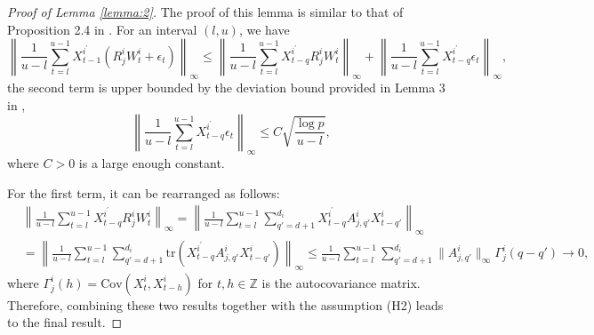 \documentclass[11pt]{article}
\begin{document}
\begin{proof}[Proof of Lemma \ref{lemma:2}]
    The proof of this lemma is similar to that of Proposition 2.4 in \cite{basu2015regularized}. For an interval $(l,u)$, we have
    \begin{equation*}
        \left\| \frac{1}{u-l}\sum_{t=l}^{u-1}X_{t-1}^{i^\prime}\left(R_j^iW_t^i + \epsilon_t\right) \right\|_\infty \leq \left\| \frac{1}{u-l}\sum_{t=l}^{u-1}X_{t-q}^{i^\prime}R_j^iW_t^i \right\|_\infty + \left\| \frac{1}{u-l}\sum_{t=l}^{u-1}X_{t-q}^{i^\prime}\epsilon_t \right\|_\infty,
    \end{equation*}
    the second term is upper bounded by the deviation bound provided in Lemma 3 in \cite{safikhani2020joint}, 
    \begin{equation*}
        \left\| \frac{1}{u-l}\sum_{t=l}^{u-1}X_{t-q}^{i^\prime}\epsilon_t \right\|_\infty \leq C\sqrt{\frac{\log p}{u-l}},
    \end{equation*}
    where $C>0$ is a large enough constant.
    
    For the first term, it can be rearranged as follows:
    \begin{equation*}
        \begin{aligned}
            &\left\| \frac{1}{u-l}\sum_{t=l}^{u-1}X_{t-q}^{i^\prime}R_j^iW_t^i \right\|_\infty = \left\|\frac{1}{u-l}\sum_{t=l}^{u-1} \sum_{q'=d+1}^{d_i}X_{t-q}^{i^\prime}A_{j,q'}^iX_{t-q'}^i \right\|_\infty \\
            &= \left\|\frac{1}{u-l}\sum_{t=l}^{u-1} \sum_{q'=d+1}^{d_i}\text{tr}\left(X_{t-q}^{i^\prime}A_{j,q'}^iX_{t-q'}^i\right) \right\|_\infty \leq \frac{1}{u-l}\sum_{t=l}^{u-1}\sum_{q'=d+1}^{d_i}\|A_{j,q'}^i\|_\infty\Gamma_j^i(q-q') \to 0,
        \end{aligned}
    \end{equation*}
    where $\Gamma_j^i(h) = \text{Cov}(X_t^i, X_{t-h}^i)$ for $t,h\in \mathbb{Z}$ is the autocovariance matrix. Therefore, combining these two results together with the assumption (H2) leads to the final result.
\end{proof}
\end{document}

